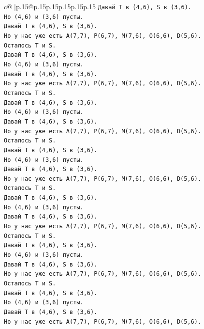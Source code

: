 \documentclass{article}
\begin{document}
{\begin{supertabular}{c@{$\;$}|p{.15\linewidth}@{}p{.15\linewidth}p{.15\linewidth}p{.15\linewidth}p{.15\linewidth}p{.15\linewidth}}
{{{\texttt{Давай T в (4,6), S в (3,6).} \\
\texttt{Но (4,6) и (3,6) пусты.} \\
\texttt{Давай T в (4,6), S в (3,6).} \\
\texttt{Но у нас уже есть A(7,7), P(6,7), M(7,6), O(6,6), D(5,6).} \\
\texttt{Осталось T и S.} \\
\texttt{Давай T в (4,6), S в (3,6).} \\
\texttt{Но (4,6) и (3,6) пусты.} \\
\texttt{Давай T в (4,6), S в (3,6).} \\
\texttt{Но у нас уже есть A(7,7), P(6,7), M(7,6), O(6,6), D(5,6).} \\
\texttt{Осталось T и S.} \\
\texttt{Давай T в (4,6), S в (3,6).} \\
\texttt{Но (4,6) и (3,6) пусты.} \\
\texttt{Давай T в (4,6), S в (3,6).} \\
\texttt{Но у нас уже есть A(7,7), P(6,7), M(7,6), O(6,6), D(5,6).} \\
\texttt{Осталось T и S.} \\
\texttt{Давай T в (4,6), S в (3,6).} \\
\texttt{Но (4,6) и (3,6) пусты.} \\
\texttt{Давай T в (4,6), S в (3,6).} \\
\texttt{Но у нас уже есть A(7,7), P(6,7), M(7,6), O(6,6), D(5,6).} \\
\texttt{Осталось T и S.} \\
\texttt{Давай T в (4,6), S в (3,6).} \\
\texttt{Но (4,6) и (3,6) пусты.} \\
\texttt{Давай T в (4,6), S в (3,6).} \\
\texttt{Но у нас уже есть A(7,7), P(6,7), M(7,6), O(6,6), D(5,6).} \\
\texttt{Осталось T и S.} \\
\texttt{Давай T в (4,6), S в (3,6).} \\
\texttt{Но (4,6) и (3,6) пусты.} \\
\texttt{Давай T в (4,6), S в (3,6).} \\
\texttt{Но у нас уже есть A(7,7), P(6,7), M(7,6), O(6,6), D(5,6).} \\
\texttt{Осталось T и S.} \\
\texttt{Давай T в (4,6), S в (3,6).} \\
\texttt{Но (4,6) и (3,6) пусты.} \\
\texttt{Давай T в (4,6), S в (3,6).} \\
\texttt{Но у нас уже есть A(7,7), P(6,7), M(7,6), O(6,6), D(5,6).} \\
            }
        }
    }
     \\ \\


\end{supertabular}}
\end{document}
